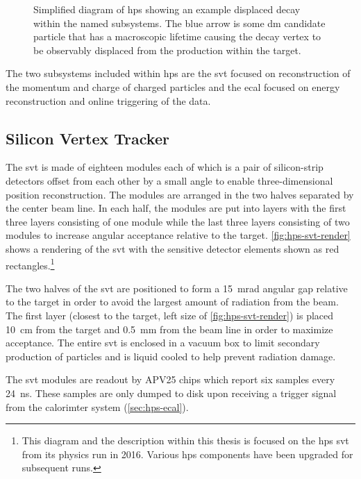 \begin{figure}
  \centering
  \resizebox{\textwidth}{!}{}
  \caption{
    Simplified diagram of \ac{hps} showing an example displaced decay within the named subsystems.
    The blue arrow is some \ac{dm} candidate particle that has a macroscopic lifetime causing
    the decay vertex to be observably displaced from the production within the target.
  }
  \label{fig:hps-diagram}
\end{figure}

The two subsystems included within \ac{hps} are the \ac{svt} focused on reconstruction of the
momentum and charge of charged particles and the \ac{ecal} focused on energy reconstruction and
online triggering of the data.

\subsection{Silicon Vertex Tracker}
The \ac{svt} is made of eighteen modules each of which is a pair of silicon-strip detectors offset
from each other by a small angle to enable three-dimensional position reconstruction. The modules
are arranged in the two halves separated by the center beam line. In each half, the modules are put
into layers with the first three layers consisting of one module while the last three layers
consisting of two modules to increase angular acceptance relative to the target.
\cref{fig:hps-svt-render} shows a rendering of the \ac{svt} with the sensitive detector elements
shown as red rectangles.\footnote{ This diagram and the description within this thesis is focused
  on the \ac{hps} \ac{svt} from its physics run in 2016. Various \ac{hps} components have been
  upgraded for subsequent runs. }

The two halves of the \ac{svt} are positioned to form a \qty{15}{\milli\radian} angular gap
relative to the target in order to avoid the largest amount of radiation from the beam. The first
layer (closest to the target, left size of \cref{fig:hps-svt-render}) is placed \qty{10}{\cm} from
the target and \qty{0.5}{\mm} from the beam line in order to maximize acceptance. The entire
\ac{svt} is enclosed in a vacuum box to limit secondary production of particles and is liquid
cooled to help prevent radiation damage.

The \ac{svt} modules are readout by APV25 chips which report six samples every \qty{24}{\ns}. These
samples are only dumped to disk upon receiving a trigger signal from the calorimter system
(\cref{sec:hps-ecal}).

